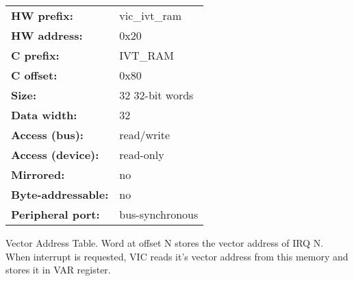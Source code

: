 \begin{small}
\begin{tabular}{l l }
{\bf HW prefix:}  & vic\_ivt\_ram\\
{\bf HW address:}  & 0x20\\
{\bf C prefix:}  & IVT\_RAM\\
{\bf C offset:}  & 0x80\\
{\bf Size:}  & 32 32-bit words\\
{\bf Data width:}  & 32\\
{\bf Access (bus):}  & read/write\\
{\bf Access (device):}  & read-only\\
{\bf Mirrored:}  & no\\
{\bf Byte-addressable:}  & no\\
{\bf Peripheral port:}  & bus-synchronous\\
\end{tabular}

\end{small}
Vector Address Table. Word at offset N stores the vector address of IRQ N. When interrupt is requested, VIC reads it's vector address from this memory and stores it in VAR register.


